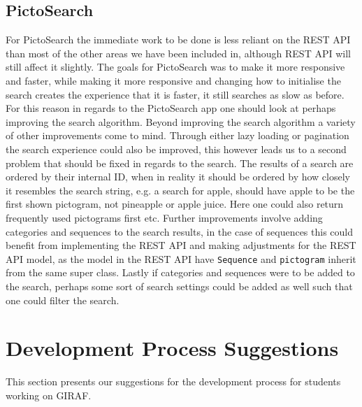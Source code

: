 \subsection*{PictoSearch}
For PictoSearch the immediate work to be done is less reliant on the REST API than most of the other areas we have been included in, although REST API will still affect it slightly.
The goals for PictoSearch was to make it more responsive and faster, while making it more responsive and changing how to initialise the search creates the experience that it is faster, it still searches as slow as before.
For this reason in regards to the PictoSearch app one should look at perhaps improving the search algorithm.
Beyond improving the search algorithm a variety of other improvements come to mind.
Through either lazy loading or pagination the search experience could also be improved, this however leads us to a second problem that should be fixed in regards to the search.
The results of a search are ordered by their internal ID, when in reality it should be ordered by how closely it resembles the search string, e.g. a search for apple, should have apple to be the first shown pictogram, not pineapple or apple juice.
Here one could also return frequently used pictograms first etc.
Further improvements involve adding categories and sequences to the search results, in the case of sequences this could benefit from implementing the REST API and making adjustments for the REST API model, as the model in the REST API have \texttt{Sequence} and \texttt{pictogram} inherit from the same super class.
Lastly if categories and sequences were to be added to the search, perhaps some sort of search settings could be added as well such that one could filter the search.

\section{Development Process Suggestions}
This section presents our suggestions for the development process for students working on GIRAF.

